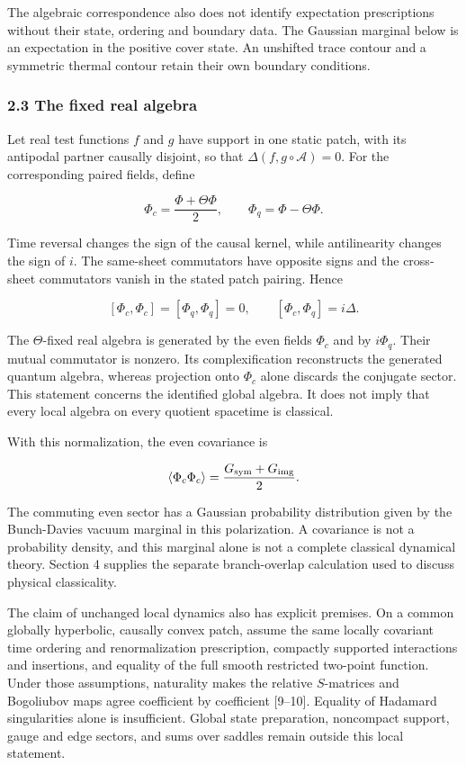 \documentclass[
]{article}
\begin{document}
The algebraic correspondence also does not identify expectation
prescriptions without their state, ordering and boundary data. The
Gaussian marginal below is an expectation in the positive cover state.
An unshifted trace contour and a symmetric thermal contour retain their
own boundary conditions.

\subsubsection{2.3 The fixed real algebra}\label{the-fixed-real-algebra}

Let real test functions \(f\) and \(g\) have support in one static
patch, with its antipodal partner causally disjoint, so that
\(\Delta(f,g\circ\mathcal A)=0\). For the corresponding paired fields,
define

\[
\Phi_c=\frac{\Phi+\Theta\Phi}{2},\qquad
\Phi_q=\Phi-\Theta\Phi.
\]

Time reversal changes the sign of the causal kernel, while antilinearity
changes the sign of \(i\). The same-sheet commutators have opposite
signs and the cross-sheet commutators vanish in the stated patch
pairing. Hence

\[
[\Phi_c,\Phi_c]=[\Phi_q,\Phi_q]=0,
\qquad
[\Phi_c,\Phi_q]=i\Delta.
\]

The \(\Theta\)-fixed real algebra is generated by the even fields
\(\Phi_c\) and by \(i\Phi_q\). Their mutual commutator is nonzero. Its
complexification reconstructs the generated quantum algebra, whereas
projection onto \(\Phi_c\) alone discards the conjugate sector. This
statement concerns the identified global algebra. It does not imply that
every local algebra on every quotient spacetime is classical.

With this normalization, the even covariance is

\[
\langle\Phi_c\Phi_c\rangle
=\frac{G_{\rm sym}+G_{\rm img}}{2}.
\]

The commuting even sector has a Gaussian probability distribution given
by the Bunch-Davies vacuum marginal in this polarization. A covariance
is not a probability density, and this marginal alone is not a complete
classical dynamical theory. Section 4 supplies the separate
branch-overlap calculation used to discuss physical classicality.

The claim of unchanged local dynamics also has explicit premises. On a
common globally hyperbolic, causally convex patch, assume the same
locally covariant time ordering and renormalization prescription,
compactly supported interactions and insertions, and equality of the
full smooth restricted two-point function. Under those assumptions,
naturality makes the relative \(S\)-matrices and Bogoliubov maps agree
coefficient by coefficient {[}9--10{]}. Equality of Hadamard
singularities alone is insufficient. Global state preparation,
noncompact support, gauge and edge sectors, and sums over saddles remain
outside this local statement.
\end{document}

